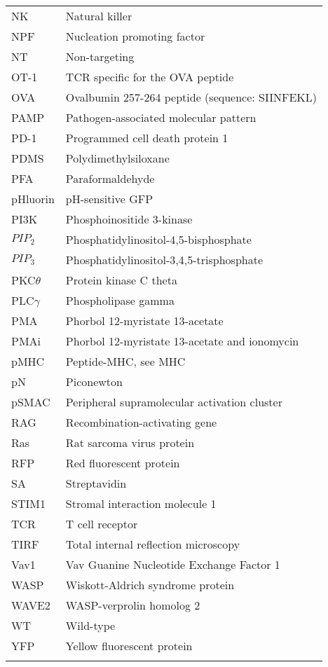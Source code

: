 \documentclass[phd,tocprelim]{cornell}
\begin{document}
\begin{longtable}{ p{} p{} }
	NK & Natural killer \\
	NPF & Nucleation promoting factor \\
	NT & Non-targeting \\
	OT-1 & TCR specific for the OVA peptide \\
	OVA & Ovalbumin 257-264 peptide (sequence: SIINFEKL) \\
	PAMP & Pathogen-associated molecular pattern \\
	PD-1 & Programmed cell death protein 1 \\
	PDMS & Polydimethylsiloxane \\
	PFA & Paraformaldehyde \\
	pHluorin & pH-sensitive GFP \\
	PI3K & Phosphoinositide 3-kinase \\
	$PIP_2$ & Phosphatidylinositol-4,5-bisphosphate \\
	$PIP_3$ & Phosphatidylinositol-3,4,5-trisphosphate \\
	PKC$\theta$ & Protein kinase C theta \\
	PLC$\gamma$ & Phospholipase gamma \\
	PMA & Phorbol 12-myristate 13-acetate \\
	PMAi & Phorbol 12-myristate 13-acetate and ionomycin \\
	pMHC & Peptide-MHC, see MHC \\
	pN & Piconewton \\
	pSMAC & Peripheral supramolecular activation cluster \\
	RAG & Recombination-activating gene \\
	Ras & Rat sarcoma virus protein \\
	RFP & Red fluorescent protein \\
	SA & Streptavidin \\
	STIM1 & Stromal interaction molecule 1 \\
	TCR & T cell receptor \\
	TIRF & Total internal reflection microscopy \\
	Vav1 & Vav Guanine Nucleotide Exchange Factor 1 \\
	WASP & Wiskott-Aldrich syndrome protein \\
	WAVE2 & WASP-verprolin homolog 2 \\
	WT & Wild-type \\
	YFP & Yellow fluorescent protein \\
	\label{tab:abbreviations}
\end{longtable}
%
\end{document}
